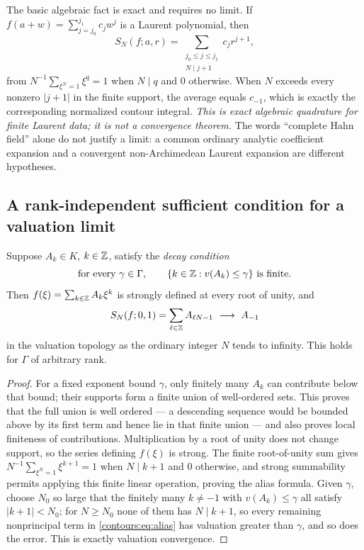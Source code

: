 \documentclass[11pt,letterpaper]{article}
\theoremstyle{definition}
\theoremstyle{remark}
\numberwithin{equation}{section}
\begin{document}
The basic algebraic fact is exact and requires no limit. If
$f(a+w)=\sum_{j=j_0}^{j_1}c_jw^j$ is a Laurent polynomial, then
\begin{equation}\label{contours:eq:rootaverage}
  S_N(f;a,r)=\sum_{\substack{j_0\le j\le j_1\\ N\mid j+1}}c_jr^{j+1},
\end{equation}
from $N^{-1}\sum_{\xi^N=1}\xi^q=1$ when $N\mid q$ and $0$ otherwise. When $N$
exceeds every nonzero $|j+1|$ in the finite support, the average equals $c_{-1}$,
which is exactly the corresponding normalized contour integral. \emph{This is exact
algebraic quadrature for finite Laurent data; it is not a convergence theorem.} The
words ``complete Hahn field'' alone do not justify a limit: a common ordinary
analytic coefficient expansion and a convergent non-Archimedean Laurent expansion
are different hypotheses.

\subsection{A rank-independent sufficient condition for a valuation limit}
\begin{proposition}
\label{contours:prop:samplingcriterion}
Suppose $A_k\in K$, $k\in\mathbb Z$, satisfy the \emph{decay condition}
\begin{equation}\label{contours:eq:decay}
  \text{for every }\gamma\in\Gamma,\qquad
  \{k\in\mathbb Z:v(A_k)\le\gamma\}\ \text{is finite}.
\end{equation}
Then $f(\xi)=\sum_{k\in\mathbb Z}A_k\xi^k$ is strongly defined at every root of unity, and
\begin{equation}\label{contours:eq:alias}
  S_N(f;0,1)=\sum_{\ell\in\Z}A_{\ell N-1}\ \longrightarrow\ A_{-1}
\end{equation}
in the valuation topology as the ordinary integer $N$ tends to infinity. This holds
for $\Gamma$ of arbitrary rank.
\end{proposition}
\begin{proof}
For a fixed exponent bound $\gamma$, only finitely many $A_k$ can contribute below
that bound; their supports form a finite union of well-ordered sets. This proves
that the full union is well ordered --- a descending sequence would be bounded above
by its first term and hence lie in that finite union --- and also proves local
finiteness of contributions. Multiplication by a root of unity does not change
support, so the series defining $f(\xi)$ is strong. The finite root-of-unity sum
gives $N^{-1}\sum_{\xi^N=1}\xi^{k+1}=1$ when $N\mid k+1$ and $0$ otherwise, and
strong summability permits applying this finite linear operation, proving the alias
formula. Given $\gamma$, choose $N_0$ so large that the finitely many $k\ne-1$ with
$v(A_k)\le\gamma$ all satisfy $|k+1|<N_0$; for $N\ge N_0$ none of them has
$N\mid k+1$, so every remaining nonprincipal term in \eqref{contours:eq:alias} has
valuation greater than $\gamma$, and so does the error. This is exactly valuation
convergence.
\end{proof}
\end{document}
